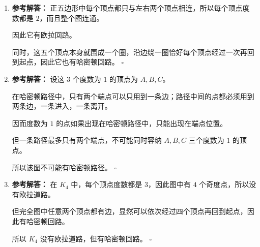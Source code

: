 \documentclass[11pt,a4paper,fontset=fandol]{ctexart}
\newenvironment{solution}{\par\noindent\textbf{参考解答：}}{\hfill$\square$\par}
\begin{document}
\begin{enumerate}
\begin{solution}
  但现在黑白点数不相等，所以不可能有哈密顿回路。
  \end{solution}

  \item \begin{solution}
  正五边形中每个顶点都只与左右两个顶点相连，所以每个顶点度数都是 $2$，而且整个图连通。

  因此它有欧拉回路。

  同时，这五个顶点本身就围成一个圈，沿边绕一圈恰好每个顶点经过一次再回到起点，因此它也有哈密顿回路。
  \end{solution}

  \item \begin{solution}
  设这 3 个度数为 $1$ 的顶点为 $A,B,C$。

  在哈密顿路径中，只有两个端点可以只用到一条边；路径中间的点都必须用到两条边，一条进入，一条离开。

  因而度数为 $1$ 的点如果出现在哈密顿路径中，只能出现在端点位置。

  但一条路径最多只有两个端点，不可能同时容纳 $A,B,C$ 三个度数为 $1$ 的顶点。

  所以该图不可能有哈密顿路径。
  \end{solution}

  \item \begin{solution}
  在 $K_4$ 中，每个顶点度数都是 $3$，因此图中有 $4$ 个奇度点，所以没有欧拉道路。

  但完全图中任意两个顶点都有边，显然可以依次经过四个顶点再回到起点，因此有哈密顿回路。

  所以 $K_4$ 没有欧拉道路，但有哈密顿回路。
  \end{solution}
\end{enumerate}
\end{document}
